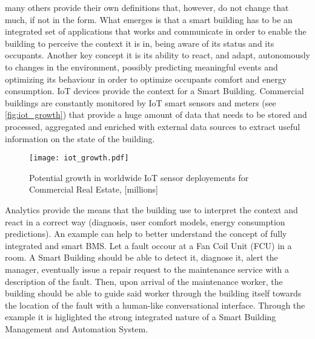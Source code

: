 many others provide their own definitions that, however,  do not change that much, if not in the form. What emerges is that a smart building has to be an integrated set of applications that works and communicate in order to enable the building to perceive the context it is in, being aware of its status and its occupants. Another key concept it is its ability to react, and adapt, autonomously to changes in the environment, possibly predicting meaningful  events and optimizing its behaviour in order to optimize occupants comfort and energy consumption.
IoT devices provide the context for a Smart Building. Commercial buildings are constantly monitored by IoT smart sensors and meters (see \autoref{fig:iot_growth}) that provide a huge amount of data that needs to be stored and processed, aggregated and enriched with external data sources to extract useful information on the state of the building.
\begin{figure}
  \centering
  \texttt{[image: iot\_growth.pdf]}
  \caption{Potential growth in worldwide IoT sensor deployements for Commercial Real Estate, [millions]}
  \label{fig:iot_growth}
\end{figure}
Analytics provide the means that the building use to interpret the context and react in a correct way (diagnosis, user comfort models, energy consumption predictions). An example can help to better understand the concept of fully integrated and smart BMS. Let a fault occour at a Fan Coil Unit (FCU) in a room. A Smart Building should be able to detect it, diagnose it, alert the manager, eventually issue a repair request to the maintenance service with a description of the fault. Then, upon arrival of the maintenance worker, the building should be able to guide said worker through the building itself towards the location of the fault with a human-like conversational interface.
Through the example it is higlighted the strong integrated nature of a Smart Building Management and Automation System.

